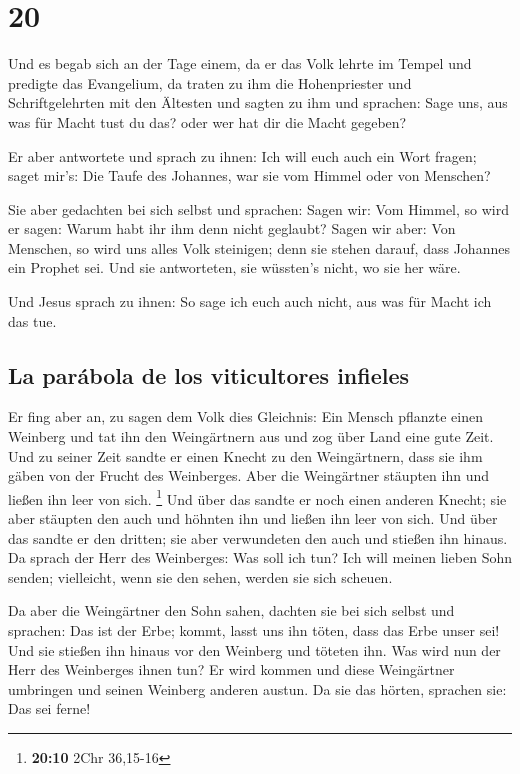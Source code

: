\hypertarget{section-19}{%
\section{20}\label{section-19}}

 Und es begab sich an der Tage einem, da er das Volk
lehrte im Tempel und predigte das Evangelium, da traten zu ihm die
Hohenpriester und Schriftgelehrten mit den Ältesten  und
sagten zu ihm und sprachen: Sage uns, aus was für Macht tust du das?
oder wer hat dir die Macht gegeben?

 Er aber antwortete und sprach zu ihnen: Ich will euch
auch ein Wort fragen; saget mir's:  Die Taufe des
Johannes, war sie vom Himmel oder von Menschen?

 Sie aber gedachten bei sich selbst und sprachen: Sagen
wir: Vom Himmel, so wird er sagen: Warum habt ihr ihm denn nicht
geglaubt?  Sagen wir aber: Von Menschen, so wird uns alles
Volk steinigen; denn sie stehen darauf, dass Johannes ein Prophet sei.
 Und sie antworteten, sie wüssten's nicht, wo sie her
wäre.

 Und Jesus sprach zu ihnen: So sage ich euch auch nicht,
aus was für Macht ich das tue.

\hypertarget{la-paruxe1bola-de-los-viticultores-infieles}{%
\subsection{La parábola de los viticultores
infieles}\label{la-paruxe1bola-de-los-viticultores-infieles}}

 Er fing aber an, zu sagen dem Volk dies Gleichnis: Ein
Mensch pflanzte einen Weinberg und tat ihn den Weingärtnern aus und zog
über Land eine gute Zeit.  Und zu seiner Zeit sandte er
einen Knecht zu den Weingärtnern, dass sie ihm gäben von der Frucht des
Weinberges. Aber die Weingärtner stäupten ihn und ließen ihn leer von
sich. \footnote{\textbf{20:10} 2Chr 36,15-16}  Und über
das sandte er noch einen anderen Knecht; sie aber stäupten den auch und
höhnten ihn und ließen ihn leer von sich.  Und über das
sandte er den dritten; sie aber verwundeten den auch und stießen ihn
hinaus.  Da sprach der Herr des Weinberges: Was soll ich
tun? Ich will meinen lieben Sohn senden; vielleicht, wenn sie den sehen,
werden sie sich scheuen.

 Da aber die Weingärtner den Sohn sahen, dachten sie bei
sich selbst und sprachen: Das ist der Erbe; kommt, lasst uns ihn töten,
dass das Erbe unser sei!  Und sie stießen ihn hinaus vor
den Weinberg und töteten ihn. Was wird nun der Herr des Weinberges ihnen
tun?  Er wird kommen und diese Weingärtner umbringen und
seinen Weinberg anderen austun. Da sie das hörten, sprachen sie: Das sei
ferne!

